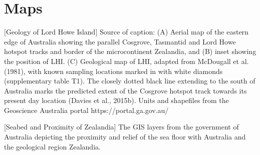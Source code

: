 \documentclass[11pt]{article}
\begin{document}
\section{Maps}
\noindent%
\begin{minipage}{\linewidth}%
\captionsetup{width=0.8\linewidth}
[Geology of Lord Howe Island]{
Source of caption\cite{reflhi}:
(A) Aerial map of the eastern edge of Australia showing the parallel Cosgrove, Tasmantid and Lord Howe hotspot tracks and border of the microcontinent
Zealandia, and (B) inset showing the position of LHI. (C) Geological map of LHI, adapted from McDougall et al. (1981), with known sampling locations marked in
with white diamonds (supplementary table T1). The closely dotted black line extending to the south of Australia marks the predicted extent of the Cosgrove hotspot
track towards its present day location (Davies et al., 2015b). Units and shapefiles from the Geoscience Australia portal https://portal.ga.gov.au/}
\label{geol1}
\end{minipage}
\vskip5mm

\noindent%
\begin{minipage}{\linewidth}%
\captionsetup{width=0.8\linewidth}
[Seabed and Proximity of Zealandia]{
The GIS layers from the government of Australia depicting the proximity
and relief of the sea floor with Australia and the geological 
region Zealandia.}
\label{geol2}
\end{minipage}
\vskip5mm
\end{document}
